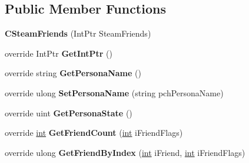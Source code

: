 \subsection*{Public Member Functions}
\begin{DoxyCompactItemize}
\item 
\hypertarget{classValve_1_1Steamworks_1_1CSteamFriends_a43d4379f192ecbb53739991f7ba83c3e}{}{\bfseries C\+Steam\+Friends} (Int\+Ptr Steam\+Friends)\label{classValve_1_1Steamworks_1_1CSteamFriends_a43d4379f192ecbb53739991f7ba83c3e}

\item 
\hypertarget{classValve_1_1Steamworks_1_1CSteamFriends_ae459ea32bc599d24a9db243f41c62413}{}override Int\+Ptr {\bfseries Get\+Int\+Ptr} ()\label{classValve_1_1Steamworks_1_1CSteamFriends_ae459ea32bc599d24a9db243f41c62413}

\item 
\hypertarget{classValve_1_1Steamworks_1_1CSteamFriends_a67d875556a1bea1b40ea012d39910b0b}{}override string {\bfseries Get\+Persona\+Name} ()\label{classValve_1_1Steamworks_1_1CSteamFriends_a67d875556a1bea1b40ea012d39910b0b}

\item 
\hypertarget{classValve_1_1Steamworks_1_1CSteamFriends_a0f0af9c2f3f99b24e15cc14bb35ac67d}{}override ulong {\bfseries Set\+Persona\+Name} (string pch\+Persona\+Name)\label{classValve_1_1Steamworks_1_1CSteamFriends_a0f0af9c2f3f99b24e15cc14bb35ac67d}

\item 
\hypertarget{classValve_1_1Steamworks_1_1CSteamFriends_a1607848129fd6dfea96a83c989e4aa67}{}override uint {\bfseries Get\+Persona\+State} ()\label{classValve_1_1Steamworks_1_1CSteamFriends_a1607848129fd6dfea96a83c989e4aa67}

\item 
\hypertarget{classValve_1_1Steamworks_1_1CSteamFriends_a31b1b46c61d74b3df5c2813aece57262}{}override \hyperlink{SDL__thread_8h_a6a64f9be4433e4de6e2f2f548cf3c08e}{int} {\bfseries Get\+Friend\+Count} (\hyperlink{SDL__thread_8h_a6a64f9be4433e4de6e2f2f548cf3c08e}{int} i\+Friend\+Flags)\label{classValve_1_1Steamworks_1_1CSteamFriends_a31b1b46c61d74b3df5c2813aece57262}

\item 
\hypertarget{classValve_1_1Steamworks_1_1CSteamFriends_a9b03c99c71d8cea3ec9ec4a1b6c2ec84}{}override ulong {\bfseries Get\+Friend\+By\+Index} (\hyperlink{SDL__thread_8h_a6a64f9be4433e4de6e2f2f548cf3c08e}{int} i\+Friend, \hyperlink{SDL__thread_8h_a6a64f9be4433e4de6e2f2f548cf3c08e}{int} i\+Friend\+Flags)\label{classValve_1_1Steamworks_1_1CSteamFriends_a9b03c99c71d8cea3ec9ec4a1b6c2ec84}


\end{DoxyCompactItemize}
